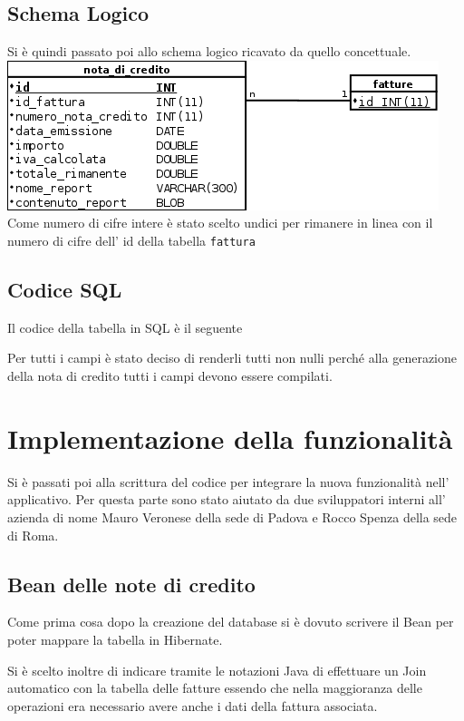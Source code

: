 \documentclass[12pt]{book}
\begin{document}
\subsection{Schema Logico}
Si è quindi passato poi allo schema logico ricavato da quello concettuale.
\newline
\newline
\includegraphics[scale=0.5]{img/schema_logico}
\newline
Come numero di cifre intere è stato scelto undici per rimanere in linea con il
numero di cifre dell' id della tabella \texttt{fattura}
\subsection{Codice SQL}
Il codice della tabella in SQL è il seguente

Per tutti i campi è stato deciso di renderli tutti non nulli perché alla
generazione della nota di credito tutti i campi devono essere compilati.
\section{Implementazione della funzionalità}
Si è passati poi alla scrittura del codice per integrare la nuova funzionalità
nell' applicativo.
Per questa parte sono stato aiutato da due sviluppatori interni all' azienda
di nome Mauro Veronese della sede di Padova e Rocco Spenza della sede di Roma.
\subsection{Bean delle note di credito}
Come prima cosa dopo la creazione del database si è dovuto scrivere il Bean per 
poter mappare la tabella in Hibernate.

Si è scelto inoltre di indicare tramite le notazioni Java di effettuare un Join
automatico con la tabella delle fatture essendo che nella maggioranza delle 
operazioni era necessario avere anche i dati della fattura associata.
\end{document}
